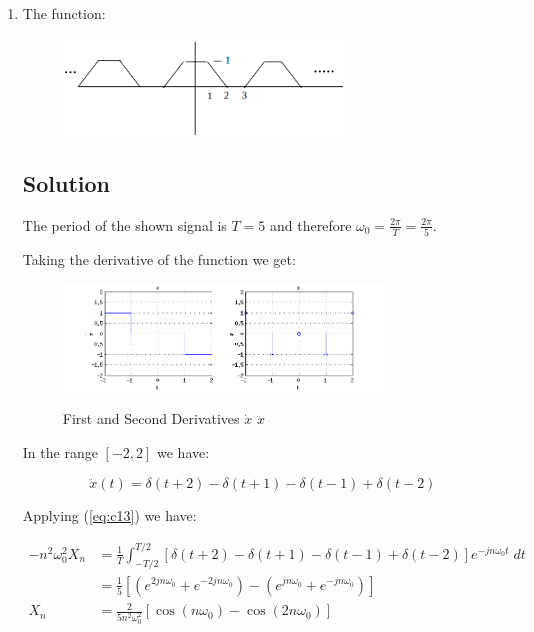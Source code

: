 \begin{enumerate}
\item The function:
\begin{figure}[H]
\caption*{}
\centering
\includegraphics[width=0.7\textwidth]{figs/c1p3e2.png}
\label{fig:c1p3e2}
\end{figure} 

\subsection*{Solution}
The period of the shown signal is $T=5$ and therefore $\omega_0 = \frac{2 \pi}{T} =  \frac{2 \pi}{5}$.

Taking the derivative of the function we get:
\begin{figure}[H]
\caption{First and Second Derivatives $\dot{x}$ $\ddot{x}$}
\centering
\includegraphics[width=0.8\textwidth]{figs/c1p3d1.png}
\label{fig:c1p3d1}
\end{figure}

In the range $[-2, 2]$ we have:

\begin{equation*}
\ddot{x}(t) = \delta(t+2) - \delta(t+1) - \delta(t-1) + \delta(t-2)
\end{equation*} 

Applying (\ref{eq:c13}) we have:

\begin{equation*}
\begin{aligned}
-n^2 \omega_0^2 X_n &= \frac{1}{T} \displaystyle\int_{- T/2}^{T/2}
	[\delta(t+2) - \delta(t+1) - \delta(t-1) + \delta(t-2)] e^{-j n \omega_0 t} \; dt\\
&=\frac{1}{5} [(e^{2 j n \omega_0} + e^{-2 j n \omega_0}) - 
			  (e^{j n \omega_0} + e^{- j n \omega_0})] \\
X_n &=\frac{2}{5 n^2 \omega_0^2} [\cos(n \omega_0) - \cos(2 n \omega_0)] \\
\end{aligned}
\end{equation*} 


\end{enumerate}
